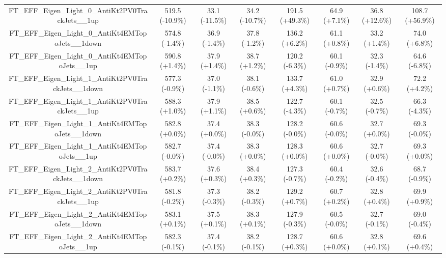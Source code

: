 \begin{table}[htbp!]
\begin{tiny}
\begin{center}
\begin{tabular}{c|c|c|c||c|c|c|c}
FT\_EFF\_Eigen\_Light\_0\_AntiKt2PV0TrackJets\_\_1up         & 519.5     (-10.9\%) & 33.1      (-11.5\%) & 34.2      (-10.7\%) & 191.5     (+49.3\%) & 64.9      (+7.1\%) & 36.8      (+12.6\%) & 108.7     (+56.9\%) \\ 
FT\_EFF\_Eigen\_Light\_0\_AntiKt4EMTopoJets\_\_1down         & 574.8     (-1.4\%) & 36.9      (-1.4\%) & 37.8      (-1.2\%) & 136.2     (+6.2\%) & 61.1      (+0.8\%) & 33.2      (+1.4\%) & 74.0      (+6.8\%) \\ 
FT\_EFF\_Eigen\_Light\_0\_AntiKt4EMTopoJets\_\_1up           & 590.8     (+1.4\%) & 37.9      (+1.4\%) & 38.7      (+1.2\%) & 120.2     (-6.3\%) & 60.1      (-0.9\%) & 32.3      (-1.4\%) & 64.6      (-6.8\%) \\ 
FT\_EFF\_Eigen\_Light\_1\_AntiKt2PV0TrackJets\_\_1down       & 577.3     (-0.9\%) & 37.0      (-1.1\%) & 38.1      (-0.6\%) & 133.7     (+4.3\%) & 61.0      (+0.7\%) & 32.9      (+0.6\%) & 72.2      (+4.2\%) \\ 
FT\_EFF\_Eigen\_Light\_1\_AntiKt2PV0TrackJets\_\_1up         & 588.3     (+1.0\%) & 37.9      (+1.1\%) & 38.5      (+0.6\%) & 122.7     (-4.3\%) & 60.1      (-0.7\%) & 32.5      (-0.7\%) & 66.3      (-4.3\%) \\ 
FT\_EFF\_Eigen\_Light\_1\_AntiKt4EMTopoJets\_\_1down         & 582.8     (+0.0\%) & 37.4      (+0.0\%) & 38.3      (-0.0\%) & 128.2     (-0.0\%) & 60.6      (-0.0\%) & 32.7      (+0.0\%) & 69.3      (-0.0\%) \\ 
FT\_EFF\_Eigen\_Light\_1\_AntiKt4EMTopoJets\_\_1up           & 582.7     (-0.0\%) & 37.4      (-0.0\%) & 38.3      (+0.0\%) & 128.3     (+0.0\%) & 60.6      (+0.0\%) & 32.7      (-0.0\%) & 69.3      (+0.0\%) \\ 
FT\_EFF\_Eigen\_Light\_2\_AntiKt2PV0TrackJets\_\_1down       & 583.7     (+0.2\%) & 37.6      (+0.3\%) & 38.4      (+0.3\%) & 127.3     (-0.7\%) & 60.4      (-0.2\%) & 32.6      (-0.4\%) & 68.7      (-0.9\%) \\ 
FT\_EFF\_Eigen\_Light\_2\_AntiKt2PV0TrackJets\_\_1up         & 581.8     (-0.2\%) & 37.3      (-0.3\%) & 38.2      (-0.3\%) & 129.2     (+0.7\%) & 60.7      (+0.2\%) & 32.8      (+0.4\%) & 69.9      (+0.9\%) \\ 
FT\_EFF\_Eigen\_Light\_2\_AntiKt4EMTopoJets\_\_1down         & 583.1     (+0.1\%) & 37.5      (+0.1\%) & 38.3      (+0.1\%) & 127.9     (-0.3\%) & 60.5      (-0.0\%) & 32.7      (-0.1\%) & 69.0      (-0.4\%) \\ 
FT\_EFF\_Eigen\_Light\_2\_AntiKt4EMTopoJets\_\_1up           & 582.3     (-0.1\%) & 37.4      (-0.1\%) & 38.2      (-0.1\%) & 128.7     (+0.3\%) & 60.6      (+0.0\%) & 32.8      (+0.1\%) & 69.6      (+0.4\%) \\ 

\end{tabular}
\end{center}
\end{tiny}
\end{table}
